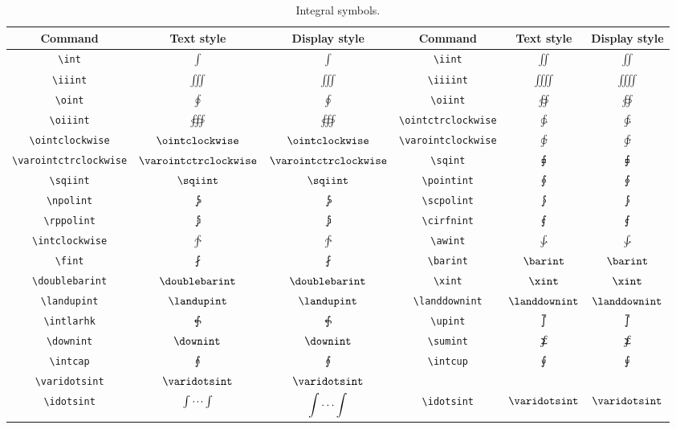 \documentclass{article}
\newcommand\tbview[1]{ \verb"#1" & $\textstyle #1$ & $\displaystyle #1$ }
\begin{document}
\pagebreak
\begin{table}[h!]
	\centering
	\begin{tabularx}{\textwidth}{|SCC|SCC|}
		\hline
		Command & Text style & Display style & Command & Text style & Display style \\
		\hline\hline
		\tbview{\int} & \tbview{\iint} \\
		\tbview{\iiint} & \tbview{\iiiint} \\
		\tbview{\oint} & \tbview{\oiint} \\
		\tbview{\oiiint} & \tbview{\ointctrclockwise} \\
		\tbview{\ointclockwise} & \tbview{\varointclockwise} \\
		\tbview{\varointctrclockwise} & \tbview{\sqint} \\
		\tbview{\sqiint} & \tbview{\pointint} \\
		\tbview{\npolint} & \tbview{\scpolint} \\
		\tbview{\rppolint} & \tbview{\cirfnint} \\
		\tbview{\intclockwise} & \tbview{\awint} \\
		\tbview{\fint} & \tbview{\barint} \\
		\tbview{\doublebarint} & \tbview{\xint} \\
		\tbview{\landupint} & \tbview{\landdownint} \\
		\tbview{\intlarhk} & \tbview{\upint} \\
		\tbview{\downint} & \tbview{\sumint} \\
		\tbview{\intcap} & \tbview{\intcup} \\
		\tbview{\varidotsint} & & & \\
		\verb"\idotsint"\footnotemark[1] & $\textstyle \idotsint$ & $\displaystyle \idotsint$ & \verb"\idotsint"\footnotemark[2] & $\textstyle \varidotsint$ & $\displaystyle \varidotsint$ \\
		\hline
	\end{tabularx}
	\caption{Integral symbols.}\label{tabl2}
\end{table}
\end{document}
